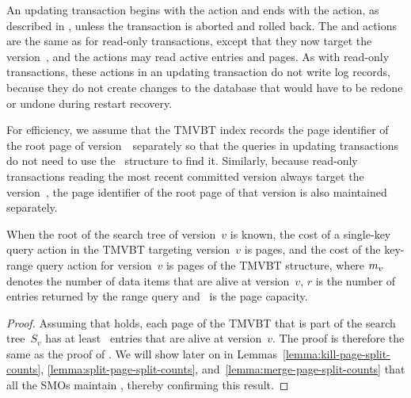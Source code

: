 An updating transaction begins with the  action and ends
with the  action, as described in
, unless the transaction is aborted and
rolled back.
The  and  actions are the same as for
read-only transactions, except that they now target the version~\actver, and
the actions may read active entries and pages.
As with read-only transactions, these actions in an updating transaction do
not write log records, because they do not create changes to the database
that would have to be redone or undone during restart recovery.

For efficiency, we assume that the TMVBT index records the page identifier of
the root page of version~\actver\ separately so that the queries in updating
transactions do not need to use the \rootstar\ structure to find it.
Similarly, because read-only transactions reading the most recent committed
version always target the version~\comver, the page identifier of the root
page of that version is also maintained separately.

\thmskip
\begin{theorem}
\label{thm:tmvbt-query-cost}
When the root of the search tree of version~$v$ is known, the cost of a
single-key query action in the TMVBT targeting version~$v$ is
 pages, and the cost of the key-range query
action for version~$v$ is 
pages of the TMVBT structure, where $m_{v}$ denotes the number of data
items that are alive at version~$v$, $r$ is the number of entries returned by
the range query and \capacity\ is the page capacity.
\end{theorem} 
\begin{proof}
Assuming that  holds, each page of the TMVBT
that is part of the search tree~$S_v$ has at least \minlive\ entries that are
alive at version~$v$. 
The proof is therefore the same as the proof of .
We will show later on in
Lemmas~\ref{lemma:kill-page-split-counts},
\ref{lemma:split-page-split-counts}, and~\ref{lemma:merge-page-split-counts} 
that all the SMOs maintain , thereby confirming
this result. 
\end{proof}
\thmskip

